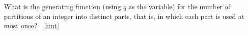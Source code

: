 \documentclass{book}
\begin{document}
\setcounter{project}{322}
\addtocounter{project}{-1}
\begin{activity}[]\label{activity-315}
\hypertarget{p-1639}{}%
What is the generating function (using \(q\) as the variable) for the number of partitions of an integer into distinct parts, that is, in which each part is used at most once?%
~\hfill{\tiny\hyperlink{a-322}{[hint]}\hypertarget{q-322}{}}\end{activity}
\end{document}
